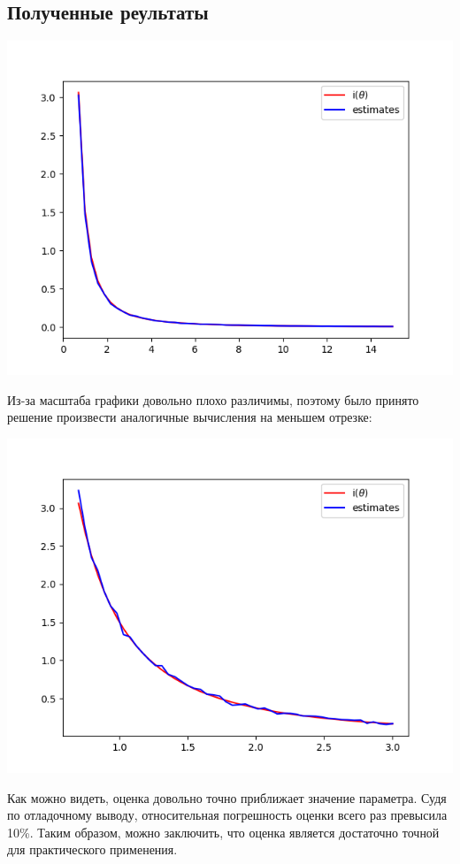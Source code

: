 \documentclass{article}
\begin{document}
\subsection{Полученные реультаты}

\includegraphics[scale=0.5]{plot_full.png}

Из-за масштаба графики довольно плохо различимы, поэтому было принято решение произвести аналогичные вычисления на меньшем отрезке:

\includegraphics[scale=0.5]{myplot.png}

Как можно видеть, оценка довольно точно приближает значение параметра. Судя по отладочному выводу, относительная погрешность оценки всего раз превысила 10\%. Таким образом, можно заключить, что оценка является достаточно точной для практического применения.
\end{document}
